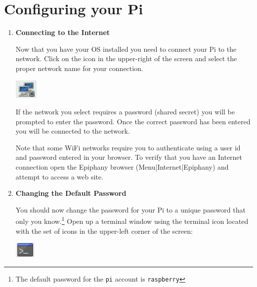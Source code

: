 \section{Configuring your Pi}


\begin{enumerate}
	
	\item \textbf{Connecting to the Internet}

Now that you have your OS installed you need to connect your Pi to the network. Click on the icon in the upper-right of the screen and select the proper network name for your connection.

\beforefig
\centerline{\includegraphics[height=1	in]{pi_images/setup/NoInternet.jpg}}
\afterfig
	
If the network you select requires a password (shared secret) you will be prompted to enter the password. Once the correct password has been entered you will be connected to the network.

Note that some WiFi networks require you to authenticate using a user id and password entered in your browser. To verify that you have an Internet connection open the Epiphany browser (Menu|Internet|Epiphany) and attempt to access a web site.

\item \textbf{Changing the Default Password}

You should now change the password for your Pi to a unique password that only you know.\footnote{The default password for the \texttt{pi} account is \texttt{raspberry}} Open up a terminal window using the terminal icon located with the set of icons in the upper-left corner of the screen:


\beforefig
\centerline{\includegraphics[height=1 in]{pi_images/setup/Terminal.jpg}}
\afterfig


\end{enumerate}
